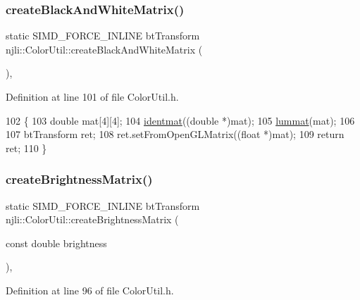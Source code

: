\subsubsection{\texorpdfstring{create\+Black\+And\+White\+Matrix()}{createBlackAndWhiteMatrix()}}
{\footnotesize\ttfamily static S\+I\+M\+D\+\_\+\+F\+O\+R\+C\+E\+\_\+\+I\+N\+L\+I\+NE bt\+Transform njli\+::\+Color\+Util\+::create\+Black\+And\+White\+Matrix (\begin{DoxyParamCaption}{ }\end{DoxyParamCaption})\hspace{0.3cm}{\ttfamily [inline]}, {\ttfamily [static]}}



Definition at line 101 of file Color\+Util.\+h.


\begin{DoxyCode}
102     \{
103       \textcolor{keywordtype}{double} mat[4][4];
104       \mbox{\hyperlink{classnjli_1_1_color_util_af683cd23fbe9098e277248be18047422}{identmat}}((\textcolor{keywordtype}{double} *)mat);
105       \mbox{\hyperlink{classnjli_1_1_color_util_aeebe354f55f34c2671f42a6d0f4d1620}{lummat}}(mat);
106 
107       btTransform ret;
108       ret.setFromOpenGLMatrix((\textcolor{keywordtype}{float} *)mat);
109       \textcolor{keywordflow}{return} ret;
110     \}
\end{DoxyCode}
\mbox{\label{classnjli_1_1_color_util_a7e24d543b65d6e9cd535fb99e87fe31e}} 
\subsubsection{\texorpdfstring{create\+Brightness\+Matrix()}{createBrightnessMatrix()}}
{\footnotesize\ttfamily static S\+I\+M\+D\+\_\+\+F\+O\+R\+C\+E\+\_\+\+I\+N\+L\+I\+NE bt\+Transform njli\+::\+Color\+Util\+::create\+Brightness\+Matrix (\begin{DoxyParamCaption}\item[{const double}]{brightness }\end{DoxyParamCaption})\hspace{0.3cm}{\ttfamily [inline]}, {\ttfamily [static]}}



Definition at line 96 of file Color\+Util.\+h.


